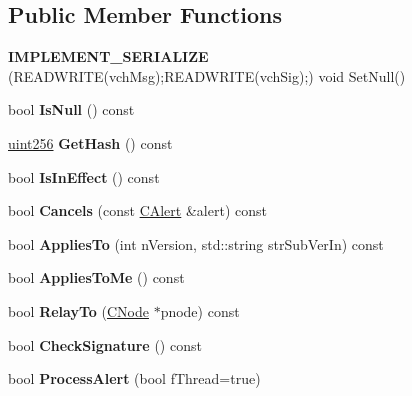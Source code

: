 \subsection*{Public Member Functions}
\begin{DoxyCompactItemize}
\item 
\mbox{\label{class_c_alert_a9efdfdb6fb8e2ab20f6129497eb02e86}} 
{\bfseries I\+M\+P\+L\+E\+M\+E\+N\+T\+\_\+\+S\+E\+R\+I\+A\+L\+I\+ZE} (R\+E\+A\+D\+W\+R\+I\+TE(vch\+Msg);R\+E\+A\+D\+W\+R\+I\+TE(vch\+Sig);) void Set\+Null()
\item 
\mbox{\label{class_c_alert_a9c728b7fe91e74c51116a23b07d6978a}} 
bool {\bfseries Is\+Null} () const
\item 
\mbox{\label{class_c_alert_a059c136c9556e5e59a1a4dc39a97366d}} 
\mbox{\hyperlink{classuint256}{uint256}} {\bfseries Get\+Hash} () const
\item 
\mbox{\label{class_c_alert_a018da40779a5c095c38bf10f4256cee6}} 
bool {\bfseries Is\+In\+Effect} () const
\item 
\mbox{\label{class_c_alert_a75777afd3418c6cd74f7e9e4caed3472}} 
bool {\bfseries Cancels} (const \mbox{\hyperlink{class_c_alert}{C\+Alert}} \&alert) const
\item 
\mbox{\label{class_c_alert_a75a0fea5dc20ad704d10496f2ef0d419}} 
bool {\bfseries Applies\+To} (int n\+Version, std\+::string str\+Sub\+Ver\+In) const
\item 
\mbox{\label{class_c_alert_aba79cc9e957446fe93f05cb18f12b24b}} 
bool {\bfseries Applies\+To\+Me} () const
\item 
\mbox{\label{class_c_alert_a21a801f1a5978889722771d4eb13bf37}} 
bool {\bfseries Relay\+To} (\mbox{\hyperlink{class_c_node}{C\+Node}} $\ast$pnode) const
\item 
\mbox{\label{class_c_alert_a862d9fb7ebdfc0483b30862d2a75d527}} 
bool {\bfseries Check\+Signature} () const
\item 
\mbox{\label{class_c_alert_af3e6b2e5d3584f58c5d7be9dbd72b4cc}} 
bool {\bfseries Process\+Alert} (bool f\+Thread=true)
\end{DoxyCompactItemize}

